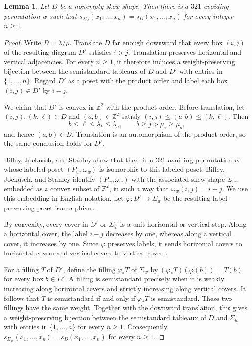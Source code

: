\documentclass[11pt]{article}
\newtheorem{lemma}[theorem]{Lemma}
\theoremstyle{definition}
\begin{document}
\begin{lemma}\label{lem:bjs-shape}
Let $D$ be a nonempty skew shape.  Then there is a $321$-avoiding permutation
$w$ such that
$s_{\Sigma_w}(x_1,\ldots,x_n)=s_D(x_1,\ldots,x_n)$ for every integer $n\ge1$.
\end{lemma}

\begin{proof}
Write $D=\lambda/\mu$.  Translate $D$ far enough downward that every box
$(i,j)$ of the resulting diagram $D'$ satisfies $i>j$.  Translation
preserves horizontal and vertical adjacencies.  For every $n\ge1$, it
therefore induces a weight-preserving bijection between the semistandard
tableaux of $D$ and $D'$ with entries in $\{1,\ldots,n\}$.  Regard $D'$ as a
poset with the product order and label each box $(i,j)\in D'$ by $i-j$.

We claim that $D'$ is convex in $\mathbb Z^2$ with the product order.
Before translation, let $(i,j),(k,\ell)\in D$ and $(a,b)\in\mathbb Z^2$
satisfy $(i,j)\le(a,b)\le(k,\ell)$.  Then
\[
  b\le\ell\le\lambda_k\le\lambda_a,
  \qquad
  b\ge j>\mu_i\ge\mu_a,
\]
and hence $(a,b)\in D$.  Translation is an automorphism of the product
order, so the same conclusion holds for $D'$.

Billey, Jockusch, and Stanley \cite[Proposition~2.2]{BJS} show that there is
a $321$-avoiding permutation $w$ whose labeled poset $(P_w,\omega_w)$ is
isomorphic to this labeled poset.  Billey, Jockusch, and Stanley
\cite[Proposition~2.1 and the discussion following it]{BJS} identify
$(P_w,\omega_w)$ with the associated skew shape $\Sigma_w$, embedded as a
convex subset of $\mathbb Z^2$, in such a way that
$\omega_w(i,j)=i-j$.  We use this embedding in English notation.  Let
$\varphi:D'\longrightarrow\Sigma_w$ be the resulting label-preserving poset
isomorphism.

By convexity, every cover in $D'$ or $\Sigma_w$ is a unit horizontal or
vertical step.  Along a horizontal cover, the label $i-j$ decreases by one,
whereas along a vertical cover, it increases by one.  Since $\varphi$ preserves
labels, it sends horizontal covers to horizontal covers and vertical covers to
vertical covers.

For a filling $T$ of $D'$, define the filling $\varphi_*T$ of $\Sigma_w$ by
$(\varphi_*T)(\varphi(b))=T(b)$ for every box $b\in D'$.  A filling is
semistandard precisely when it is weakly increasing along horizontal covers
and strictly increasing along vertical covers.  It follows that $T$ is
semistandard if and only if $\varphi_*T$ is semistandard.  These two fillings
have the same weight.  Together with the downward translation, this gives a
weight-preserving bijection between the semistandard tableaux of $D$ and
$\Sigma_w$ with entries in $\{1,\ldots,n\}$ for every $n\ge1$.  Consequently,
$s_{\Sigma_w}(x_1,\ldots,x_n)=s_D(x_1,\ldots,x_n)$ for every $n\ge1$.
\end{proof}
\end{document}
